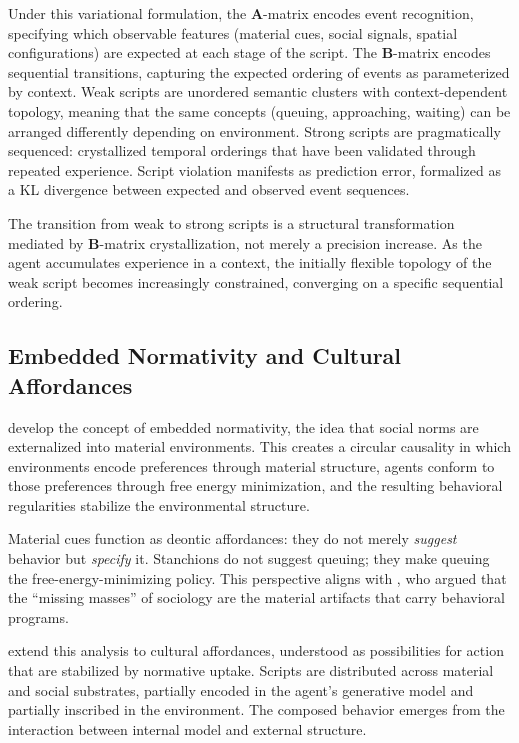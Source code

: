 \documentclass[11pt,a4paper]{article}
\newcommand{\A}{\mathbf{A}}
\newcommand{\B}{\mathbf{B}}
\begin{document}
Under this variational formulation, the $\A$-matrix encodes event recognition, specifying which observable features (material cues, social signals, spatial configurations) are expected at each stage of the script.  The $\B$-matrix encodes sequential transitions, capturing the expected ordering of events as parameterized by context.  Weak scripts are unordered semantic clusters with context-dependent topology, meaning that the same concepts (queuing, approaching, waiting) can be arranged differently depending on environment.  Strong scripts are pragmatically sequenced: crystallized temporal orderings that have been validated through repeated experience.  Script violation manifests as prediction error, formalized as a KL divergence between expected and observed event sequences.

The transition from weak to strong scripts is a structural transformation mediated by $\B$-matrix crystallization, not merely a precision increase.  As the agent accumulates experience in a context, the initially flexible topology of the weak script becomes increasingly constrained, converging on a specific sequential ordering.

\subsection{Embedded Normativity and Cultural Affordances}

\citet{guenincarlut2023embedded} develop the concept of embedded normativity, the idea that social norms are externalized into material environments.  This creates a circular causality in which environments encode preferences through material structure, agents conform to those preferences through free energy minimization, and the resulting behavioral regularities stabilize the environmental structure.

Material cues function as deontic affordances: they do not merely \emph{suggest} behavior but \emph{specify} it.  Stanchions do not suggest queuing; they make queuing the free-energy-minimizing policy.  This perspective aligns with \citet{latour1992missing}, who argued that the ``missing masses'' of sociology are the material artifacts that carry behavioral programs.

\citet{albarracin2022cultural} extend this analysis to cultural affordances, understood as possibilities for action that are stabilized by normative uptake.  Scripts are distributed across material and social substrates, partially encoded in the agent's generative model and partially inscribed in the environment.  The composed behavior emerges from the interaction between internal model and external structure.
\end{document}

